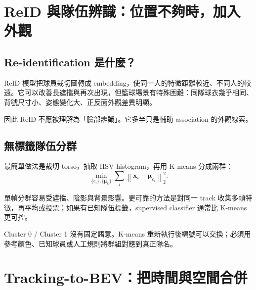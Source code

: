 \documentclass[11pt,a4paper,oneside]{report}
\begin{document}
\section{ReID 與隊伍辨識：位置不夠時，加入外觀}

\subsection{Re-identification 是什麼？}

ReID 模型把球員裁切圖轉成 embedding，使同一人的特徵距離較近、不同人的較遠。它可以改善長遮擋與再次出現，但籃球場景有特殊困難：同隊球衣幾乎相同、背號尺寸小、姿態變化大、正反面外觀差異明顯。

因此 ReID 不應被理解為「臉部辨識」。它多半只是輔助 association 的外觀線索。

\subsection{無標籤隊伍分群}

最簡單做法是裁切 torso，抽取 HSV histogram，再用 K-means 分成兩群：
\[
\min_{\{c_i\},\{\boldsymbol\mu_k\}}
\sum_i\left\|\mathbf x_i-\boldsymbol\mu_{c_i}\right\|_2^2.
\]

\begin{center}
\end{center}

單幀分群容易受遮擋、陰影與背景影響。更可靠的方法是對同一 track 收集多幀特徵，再平均或投票；如果有已知隊伍標籤，supervised classifier 通常比 K-means 更可控。

\begin{riskBox}
Cluster 0 / Cluster 1 沒有固定語意。K-means 重新執行後編號可以交換；必須用參考顏色、已知球員或人工規則將群組對應到真正隊名。
\end{riskBox}

\section{Tracking-to-BEV：把時間與空間合併}
\end{document}
